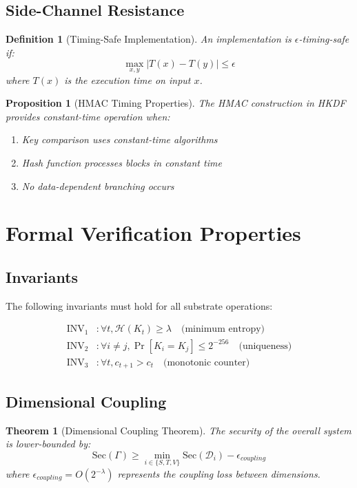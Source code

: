 \documentclass[11pt]{article}
\newtheorem{definition}{Definition}
\newtheorem{theorem}{Theorem}
\newtheorem{proposition}{Proposition}
\begin{document}
\subsection{Side-Channel Resistance}

\begin{definition}[Timing-Safe Implementation]
An implementation is $\epsilon$-timing-safe if:
\[\max_{x,y} |T(x) - T(y)| \leq \epsilon\]
where $T(x)$ is the execution time on input $x$.
\end{definition}

\begin{proposition}[HMAC Timing Properties]
The HMAC construction in HKDF provides constant-time operation when:
\begin{enumerate}
    \item Key comparison uses constant-time algorithms
    \item Hash function processes blocks in constant time
    \item No data-dependent branching occurs
\end{enumerate}
\end{proposition}

\section{Formal Verification Properties}

\subsection{Invariants}

The following invariants must hold for all substrate operations:

\begin{align}
\text{INV}_1 &: \forall t, \mathcal{H}(K_t) \geq \lambda \quad \text{(minimum entropy)}\\
\text{INV}_2 &: \forall i \neq j, \Pr[K_i = K_j] \leq 2^{-256} \quad \text{(uniqueness)}\\
\text{INV}_3 &: \forall t, c_{t+1} > c_t \quad \text{(monotonic counter)}
\end{align}

\subsection{Dimensional Coupling}

\begin{theorem}[Dimensional Coupling Theorem]
The security of the overall system is lower-bounded by:
\[\text{Sec}(\Gamma) \geq \min_{i \in \{S,T,V\}} \text{Sec}(\mathcal{D}_i) - \epsilon_{coupling}\]
where $\epsilon_{coupling} = O(2^{-\lambda})$ represents the coupling loss between dimensions.
\end{theorem}
\end{document}

